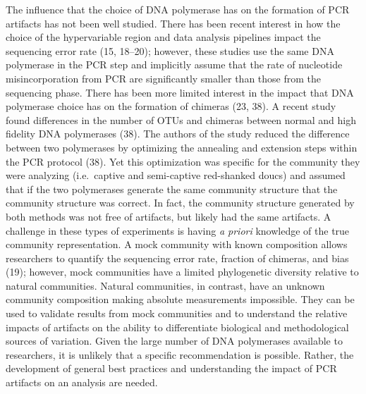 \documentclass[11pt,]{article}
\begin{document}
The influence that the choice of DNA polymerase has on the formation of
PCR artifacts has not been well studied. There has been recent interest
in how the choice of the hypervariable region and data analysis
pipelines impact the sequencing error rate (15, 18--20); however, these
studies use the same DNA polymerase in the PCR step and implicitly
assume that the rate of nucleotide misincorporation from PCR are
significantly smaller than those from the sequencing phase. There has
been more limited interest in the impact that DNA polymerase choice has
on the formation of chimeras (23, 38). A recent study found differences
in the number of OTUs and chimeras between normal and high fidelity DNA
polymerases (38). The authors of the study reduced the difference
between two polymerases by optimizing the annealing and extension steps
within the PCR protocol (38). Yet this optimization was specific for the
community they were analyzing (i.e.~captive and semi-captive red-shanked
doucs) and assumed that if the two polymerases generate the same
community structure that the community structure was correct. In fact,
the community structure generated by both methods was not free of
artifacts, but likely had the same artifacts. A challenge in these types
of experiments is having \emph{a priori} knowledge of the true community
representation. A mock community with known composition allows
researchers to quantify the sequencing error rate, fraction of chimeras,
and bias (19); however, mock communities have a limited phylogenetic
diversity relative to natural communities. Natural communities, in
contrast, have an unknown community composition making absolute
measurements impossible. They can be used to validate results from mock
communities and to understand the relative impacts of artifacts on the
ability to differentiate biological and methodological sources of
variation. Given the large number of DNA polymerases available to
researchers, it is unlikely that a specific recommendation is possible.
Rather, the development of general best practices and understanding the
impact of PCR artifacts on an analysis are needed.
\end{document}
